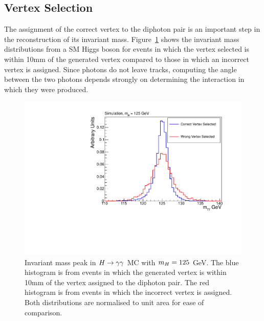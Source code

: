\subsection{Vertex Selection}
\label{sec:vertexselection}

The assignment of the correct vertex to the diphoton pair is an important step in the reconstruction of 
its invariant mass. Figure~\ref{fig:higgsrightwrongvertex} shows the invariant mass distributions from a SM
Higgs boson for events in which the vertex selected is within 10mm of the generated vertex
compared to those in which an incorrect vertex is assigned. 
Since photons do not leave tracks, computing the angle between the two photons 
depends strongly on determining the interaction in which they were produced.

\begin{figure}
\includegraphics[width=.8\textwidth]{hgg7TeV/generalPlots/rightwrongvtxpeak.pdf}
\caption{Invariant mass peak in $H\rightarrow\gamma\gamma$ MC with $m_{H}=125$ GeV. The blue histogram is from events in which 
the generated vertex is within 10mm of the vertex assigned to the diphoton pair. The red histogram is 
from events in which the incorrect vertex is assigned. Both distributions are normalised to unit area for
ease of comparison.}
\label{fig:higgsrightwrongvertex}
\end{figure} 

